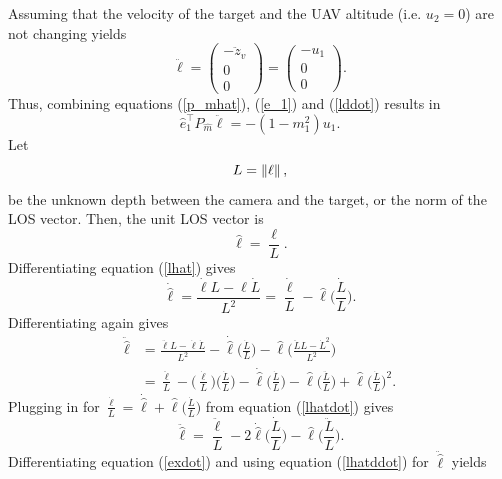 Assuming that the velocity of the target and the UAV altitude (i.e. $u_2=0$) are not changing yields
\begin{equation}
\ddot{\ell}=\begin{pmatrix} -\ddot{z}_v \\ 0 \\ 0 \end{pmatrix}
=\begin{pmatrix} -u_1 \\ 0 \\ 0 \end{pmatrix}.
\label{lddot}
\end{equation}
Thus, combining equations (\ref{p_mhat}), (\ref{e_1}) and (\ref{lddot})
results in 
\begin{equation}
\hat{e}_1^{\top}P_{\hat{m}}\ddot{\ell}=-(1-m_1^2)u_1.
\label{eplddot}
\end{equation}
Let
\begin{equation}
L=\left\lVert\ell\right\rVert,
\end{equation} be the unknown depth between the camera and the target, or the norm of the LOS vector. Then, the unit LOS vector is 
\begin{equation}
\hat{\ell}=\frac{\ell}{L}.
\label{lhat}
\end{equation}
Differentiating equation (\ref{lhat}) gives
\begin{equation}
\dot{\hat{\ell}}=\frac{\dot{\ell}L-\ell\dot{L}}{L^2}=\frac{\dot{\ell}}{L}-\hat{\ell}\bigg(\frac{\dot{L}}{L}\bigg).
\label{lhatdot}
\end{equation}
Differentiating again gives
\begin{align}
\ddot{\hat{\ell}}&=\frac{\ddot{\ell}L-\dot{\ell}\dot{L}}{L^2}-\dot{\hat{\ell}}\bigg(\frac{\dot{L}}{L}\bigg)-\hat{\ell}\bigg(\frac{\ddot{L}L-\dot{L}^2}{L^2}\bigg)
\\&=\frac{\ddot{\ell}}{L}-\bigg(\frac{\dot{\ell}}{L}\bigg)\bigg(\frac{\dot{L}}{L}\bigg)-\dot{\hat{\ell}}\bigg(\frac{\dot{L}}{L}\bigg)-\hat{\ell}\bigg(\frac{\ddot{L}}{L}\bigg)+\hat{\ell}\bigg(\frac{\dot{L}}{L}\bigg)^2.
\end{align}
Plugging in for $\frac{\dot{\ell}}{L}=\dot{\hat{\ell}}+\hat{\ell}\bigg(\frac{\dot{L}}{L}\bigg)$ from equation (\ref{lhatdot}) gives
\begin{equation}
\ddot{\hat{\ell}}=\frac{\ddot{\ell}}{L}-2\dot{\hat{\ell}}\bigg(\frac{\dot{L}}{L}\bigg)-\hat{\ell}\bigg(\frac{\ddot{L}}{L}\bigg).
\label{lhatddot}
\end{equation}
Differentiating equation (\ref{exdot}) and using equation (\ref{lhatddot}) for $\ddot{\hat{\ell}}$ yields

